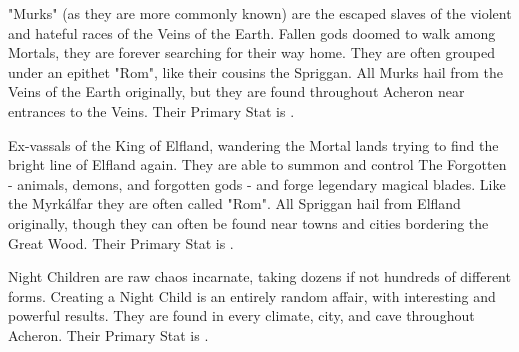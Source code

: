 {{    \item {}  "Murks" (as they are more commonly known) are the escaped slaves of the violent and hateful races of the Veins of the Earth.  Fallen gods doomed to walk among Mortals, they are forever searching for their way home.  They are often grouped under an epithet "Rom", like their cousins the Spriggan. All Murks hail from the Veins of the Earth originally, but they are found throughout Acheron near entrances to the Veins.  Their Primary Stat is .

    \item {} Ex-vassals of the King of Elfland, wandering the Mortal lands trying to find the bright line of Elfland again.  They are able to summon and control The Forgotten - animals, demons, and forgotten gods - and forge legendary magical blades.  Like the Myrkálfar they are often called "Rom".  All Spriggan hail from Elfland originally, though they can often be found near towns and cities bordering the Great Wood. Their Primary Stat is .
    
    \item {}  Night Children are raw chaos incarnate, taking dozens if not hundreds of different forms.  Creating a Night Child is an entirely random affair, with interesting and powerful results. They are found in every climate, city, and cave throughout Acheron. Their Primary Stat is .
  }

  \newpage




    
}
